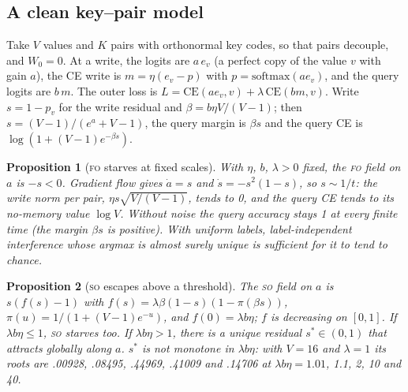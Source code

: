 \documentclass[11pt]{article}
\newtheorem{proposition}{Proposition}
\newcommand{\FO}{\textsc{fo}}
\newcommand{\SO}{\textsc{so}}
\begin{document}
\subsection{A clean key--pair model}

Take $V$ values and $K$ pairs with orthonormal key codes, so that pairs decouple, and $W_0=0$. At a
write, the logits are $a\,e_v$ (a perfect copy of the value $v$ with gain $a$), the CE write is
$m=\eta(e_v-p)$ with $p=\mathrm{softmax}(a e_v)$, and the query logits are $b\,m$. The outer loss is
$L=\mathrm{CE}(a e_v,v)+\lambda\,\mathrm{CE}(b m,v)$. Write $s=1-p_v$ for the write residual and
$\beta=b\eta V/(V-1)$; then $s=(V-1)/(e^a+V-1)$, the query margin is $\beta s$ and the query CE is
$\log(1+(V-1)e^{-\beta s})$.

\begin{proposition}[\FO{} starves at fixed scales]
\label{prop:fo-starve}
With $\eta$, $b$, $\lambda>0$ fixed, the \FO{} field on $a$ is $-s<0$. Gradient flow gives $\dot a=s$ and
$\dot s=-s^2(1-s)$, so $s\sim1/t$: the write norm per pair, $\eta s\sqrt{V/(V-1)}$, tends to 0, and the
query CE tends to its no-memory value $\log V$. Without noise the query accuracy stays 1 at every
finite time (the margin $\beta s$ is positive). With uniform labels, label-independent interference
whose argmax is almost surely unique is sufficient for it to tend to chance.
\end{proposition}

\begin{proposition}[\SO{} escapes above a threshold]
\label{prop:so-escape}
The \SO{} field on $a$ is $s(f(s)-1)$ with $f(s)=\lambda\beta(1-s)(1-\pi(\beta s))$,
$\pi(u)=1/(1+(V-1)e^{-u})$, and $f(0)=\lambda b\eta$; $f$ is decreasing on $[0,1]$. If
$\lambda b\eta\le1$, \SO{} starves too. If $\lambda b\eta>1$, there is a unique residual
$s^\ast\in(0,1)$ that attracts globally along $a$. $s^\ast$ is not monotone in $\lambda b\eta$: with
$V=16$ and $\lambda=1$ its roots are .00928, .08495, .44969, .41009 and .14706 at
$\lambda b\eta=1.01$, 1.1, 2, 10 and 40.
\end{proposition}
\end{document}
